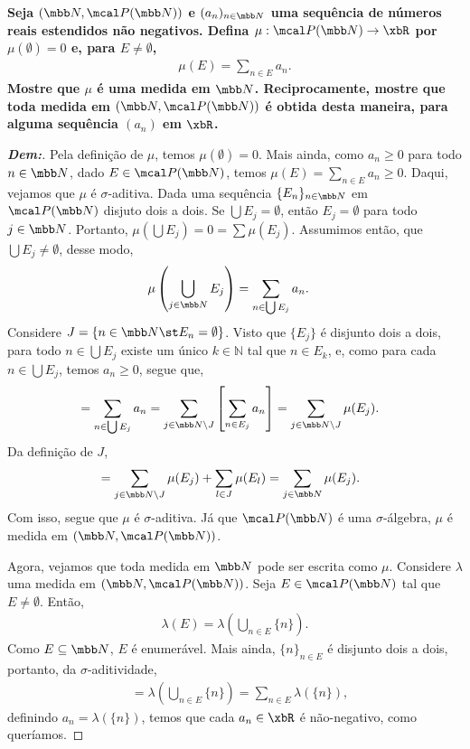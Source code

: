 \biglinend
\newpage 
{}
\myexe{\thedois}
\bigline
\textbf{Seja $(\mbb N, \mcal P(\mbb N))$ e $(a_n)_{n \in \mbb N}$ uma sequência 
de números reais estendidos não negativos. Defina $\mu: \mcal P(\mbb N) \rightarrow \xbR$
por $\mu(\emptyset) = 0$ e, para $E \neq \emptyset$,
\begin{align*}
  \mu(E) = \sum_{n \in E} a_n.
\end{align*}
Mostre que $\mu$ é uma medida em $\mbb N$. Reciprocamente, mostre que toda medida 
em $(\mbb N, \mcal P(\mbb N))$ é obtida desta maneira, para alguma sequência 
$(a_n)$ em $\xbR$.
}
\begin{proof}[\textbf{Dem:}]
  Pela definição de $\mu$, temos $\mu(\emptyset) = 0$. Mais ainda, como $a_n \ge 0$ para todo $n \in \mbb N$, dado 
  $E \in \mcal P(\mbb N)$, temos
  $\mu(E) = \sum_{n \in E} a_n \ge 0$. Daqui, vejamos que $\mu$ é $\sigma$-aditiva. Dada uma sequência 
  $\{E_n\}_{n \in \mbb N}$ em $\mcal P(\mbb N)$ disjuto dois a dois. Se $\bigcup E_j = \emptyset$, então $E_j = \emptyset$ para todo 
  $j \in \mbb N$. Portanto, $\mu(\bigcup E_j) = 0 = \sum \mu(E_j)$. Assumimos então, que $\bigcup E_j \neq \emptyset$, 
  desse modo,
  \begin{align*}
    \mu\left(\bigcup\limits_{j \in \mbb N} E_j\right) &= \sum_{n \in \bigcup E_j} a_n.
  \end{align*}
  Considere $J = \{n \in \mbb N\st  E_n = \emptyset\}$. Visto que $\{E_j\}$ é disjunto dois a dois,
  para todo $n \in \bigcup E_j$ existe um único $k \in \mathbb N$ tal que 
  $n \in E_k$, e, como para cada $n \in \bigcup E_j$, temos $a_n \ge 0$, segue que,
  \begin{align*}
    &= \sum_{n \in \bigcup E_j} a_n = \sum_{j \in \mbb N \setminus J} \left[\sum_{n \in E_j} a_n\right]
    = \sum_{j \in \mbb N \setminus J} \mu(E_j).
  \end{align*}
  Da definição de $J$, 
\begin{align*}
  &= \sum_{j \in \mbb N \setminus J} \mu(E_j) + \sum_{l \in J}\mu(E_l) = \sum_{j \in \mbb N} \mu(E_j).
\end{align*}
  Com isso, segue que $\mu$ é $\sigma$-aditiva. Já que $\mcal P (\mbb N)$ é uma $\sigma$-álgebra, $\mu$ é medida em 
  $(\mbb N, \mcal P (\mbb N))$.

  Agora, vejamos que toda medida em $\mbb N$ pode ser escrita como $\mu$. Considere $\lambda$ 
  uma medida em $(\mbb N, \mcal P (\mbb N))$. Seja $E \in \mcal P (\mbb N)$ tal que $E \neq \emptyset$.
  Então, 
  \begin{align*}
    \lambda(E) = \lambda\left(\bigcup\limits_{n \in E} \{n\}\right).
  \end{align*}
  Como $E \subseteq \mbb N$, $E$ é enumerável. Mais ainda, $\{n\}_{n \in E}$ é disjunto dois a dois, portanto, 
  da $\sigma$-aditividade, 
  \begin{align*}
    &= \lambda\left(\bigcup\limits_{n \in E} \{n\}\right) = \sum_{n \in E} \lambda(\{n\}),
  \end{align*}
  definindo $a_n = \lambda(\{n\})$, temos que cada $a_n \in \xbR$ é não-negativo, 
  como queríamos.
\end{proof}

